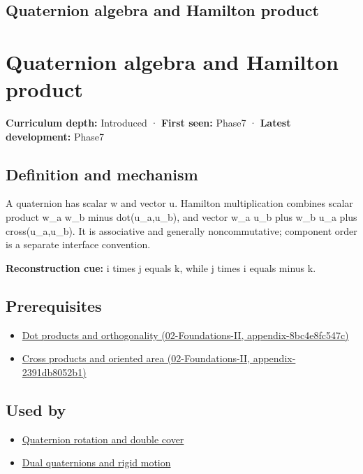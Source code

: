 \hypertarget{appendix-965d9260eeab}{}
\section*{Quaternion algebra and Hamilton product}
\chapter{Quaternion algebra and Hamilton product}\label{appendix-965d9260eeab-quaternion-algebra-and-hamilton-product}

\textbf{Curriculum depth:} Introduced · \textbf{First seen:} Phase7 · \textbf{Latest development:} Phase7

\section{Definition and mechanism}\label{appendix-965d9260eeab-definition-and-mechanism}

A quaternion has scalar w and vector u. Hamilton multiplication combines scalar product w\_a w\_b minus dot(u\_a,u\_b), and vector w\_a u\_b plus w\_b u\_a plus cross(u\_a,u\_b). It is associative and generally noncommutative; component order is a separate interface convention.

\textbf{Reconstruction cue:} i times j equals k, while j times i equals minus k.

\section{Prerequisites}\label{appendix-965d9260eeab-prerequisites}

\begin{itemize}
\tightlist
\item
  \href{../02-Foundations-II/main.pdf\#nameddest=appendix-8bc4e8fc547c}{Dot products and orthogonality (02-Foundations-II, appendix-8bc4e8fc547c)}
\item
  \href{../02-Foundations-II/main.pdf\#nameddest=appendix-2391db8052b1}{Cross products and oriented area (02-Foundations-II, appendix-2391db8052b1)}
\end{itemize}

\section{Used by}\label{appendix-965d9260eeab-used-by}

\begin{itemize}
\tightlist
\item
  \hyperref[appendix-8e61ab68f6b2]{Quaternion rotation and double cover}
\item
  \hyperref[appendix-d1ea57347893]{Dual quaternions and rigid motion}
\end{itemize}

